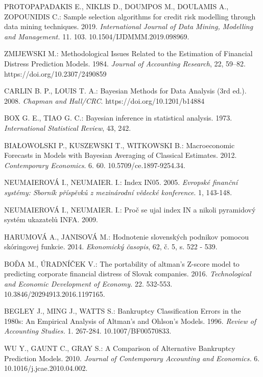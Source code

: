 \begin{thebibliography}{99}
     PROTOPAPADAKIS E., NIKLIS D., DOUMPOS M., DOULAMIS A., ZOPOUNIDIS C.: Sample selection algorithms for credit risk modelling through data mining techniques. 2019.
    \emph{International Journal of Data Mining, Modelling and Management.} 11. 103. 10.1504/IJDMMM.2019.098969.

     ZMIJEWSKI M.: Methodological Issues Related to the Estimation of Financial Distress Prediction Models. 1984. \emph{Journal of Accounting Research}, 22, 59–82. https://doi.org/10.2307/2490859

     CARLIN B. P., LOUIS T. A.: Bayesian Methods for Data Analysis (3rd ed.). 2008. \emph{Chapman and Hall/CRC}. https://doi.org/10.1201/b14884

     BOX G. E., TIAO G. C.: Bayesian inference in statistical analysis. 1973. \emph{International Statistical Review}, 43, 242.

     BIAŁOWOLSKI P., KUSZEWSKI T., WITKOWSKI B.: Macroeconomic Forecasts in Models with Bayesian Averaging of Classical Estimates.
    2012. \emph{Contemporary Economics}. 6. 60. 10.5709/ce.1897-9254.34.

     NEUMAIEROVÁ I., NEUMAIER. I.: Index IN05. 2005.
    \emph{Evropské finanční systémy: Sborník příspěvků z mezinárodní vědecké konference}. 1, 143-148.

     NEUMAIEROVÁ I., NEUMAIER. I.: Proč se ujal index IN a nikoli pyramidový systém ukazatelů INFA. 2009.

     HARUMOVÁ A., JANISOVÁ M.: Hodnotenie slovenských podnikov pomocou skóringovej funkcie. 2014. \emph{Ekonomický časopis}, 62, č. 5, s. 522 - 539.

     BOĎA M., ÚRADNÍČEK V.: The portability of altman’s Z-score model to predicting corporate financial distress of Slovak companies. 2016.
    \emph{Technological and Economic Development of Economy.} 22. 532-553. 10.3846/20294913.2016.1197165.

     BEGLEY J., MING J., WATTS S.: Bankruptcy Classification Errors in the 1980s: An Empirical Analysis of Altman's and Ohlson's Models.
    1996. \emph{Review of Accounting Studies.} 1. 267-284. 10.1007/BF00570833.

     WU Y., GAUNT C., GRAY S.: A Comparison of Alternative Bankruptcy Prediction Models. 
    2010. \emph{Journal of Contemporary Accounting and Economics.} 6. 10.1016/j.jcae.2010.04.002.


\end{thebibliography}
